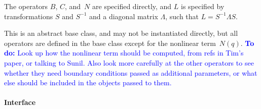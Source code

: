 \documentclass[11pt]{article}
\def\todo#1{\textcolor{blue}{{\bf To do:} #1}}
\begin{document}
The operators $B$, $C$, and~$N$ are specified directly, and $L$ is specified by transformations $S$ and $S^{-1}$ and a diagonal matrix $\Lambda$, such that $L=S^{-1}\Lambda S$.

This is an abstract base class, and may not be instantiated directly, but all operators are defined in the base class except for the nonlinear term~$N(q)$.  \todo{Look up how the nonlinear term should be computed, from refs in Tim's paper, or talking to Sunil.  Also look more carefully at the other operators to see whether they need boundary conditions passed as additional parameters, or what else should be included in the objects passed to them.}

\paragraph{Interface}
\end{document}
